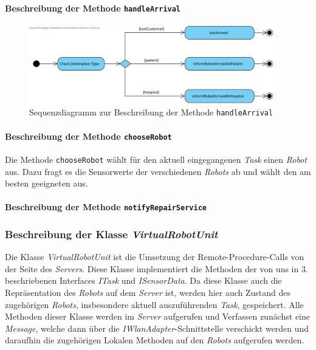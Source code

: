 			\paragraph{Beschreibung der Methode \texttt{handleArrival}}
			\begin{figure}[H]
			\centering
			\includegraphics[width=0.95\textwidth]{img/HandleArrival}
			\caption{Sequenzdiagramm zur Beschreibung der Methode \texttt{handleArrival}}
			\label{SequenzQueuePoll}
			\end{figure}	
			\paragraph{Beschreibung der Methode \texttt{chooseRobot}}
			Die Methode \texttt{chooseRobot} wählt für den aktuell eingegangenen \emph{Task} einen \emph{Robot} aus. 
			Dazu fragt es die Sensorwerte der verschiedenen \emph{Robots} ab und wählt den am besten geeigneten aus.

			\paragraph{Beschreibung der Methode \texttt{notifyRepairService}}

	\subsubsection{Beschreibung der Klasse \textit{VirtualRobotUnit}}
	Die Klasse \textit{VirtualRobotUnit} ist die Umsetzung der Remote-Procedure-Calls von der Seite des \textit{Servers}. Diese Klasse implementiert die Methoden der von uns in 3. beschriebenen Interfaces \textit{ITask} und \textit{ISensorData}. Da diese Klasse auch die Repräsentation des \textit{Robots} auf dem \textit{Server} ist, werden hier auch Zustand des zugehörigen \textit{Robots}, insbesondere aktuell auszuführenden \textit{Task}, gespeichert. Alle Methoden dieser Klasse werden im \textit{Server} aufgerufen und Verfassen zunächst eine \textit{Message}, welche dann über die \textit{IWlanAdapter}-Schnittstelle verschickt werden und daraufhin die zugehörigen Lokalen Methoden auf den \textit{Robots} aufgerufen werden.
	
